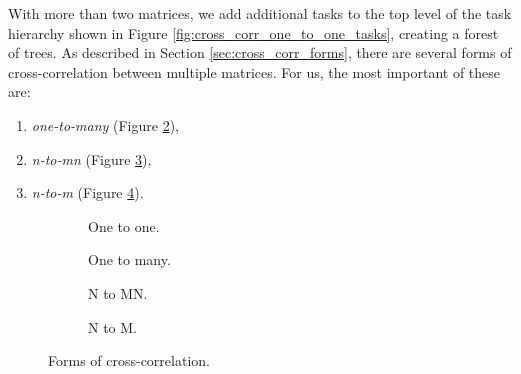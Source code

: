 With more than two matrices, we add additional tasks to the top level of the task hierarchy shown in Figure \ref{fig:cross_corr_one_to_one_tasks}, creating a forest of trees. As described in Section \ref{sec:cross_corr_forms}, there are several forms of cross-correlation between multiple matrices. For us, the most important of these are:
\begin{enumerate}
	\item \textit{one-to-many} (Figure \ref{fig:implementation_one_to_many}),
	\item \textit{n-to-mn} (Figure \ref{fig:implementation_n_to_mn}),
	\item \textit{n-to-m} (Figure \ref{fig:implementation_n_to_m}).
\end{enumerate}

\begin{figure}
	\centering	
	\begin{subfigure}{0.4\textwidth}
		\centering
		\def\svgwidth{0.5\textwidth}
		
		\caption{One to one.}
		\label{fig:implementation_one_to_one}
	\end{subfigure}
	\hfill
	\begin{subfigure}{0.4\textwidth}
		\centering
		\def\svgwidth{0.5\textwidth}
		
		\caption{One to many.}
		\label{fig:implementation_one_to_many}
	\end{subfigure}
	\hfill
	\begin{subfigure}{0.4\textwidth}
		\centering
		\def\svgwidth{0.7\textwidth}
		
		\caption{N to MN.}
		\label{fig:implementation_n_to_mn}
	\end{subfigure}
	\hfill
	\begin{subfigure}{0.4\textwidth}
		\centering
		\def\svgwidth{0.7\textwidth}
		
		\caption{N to M.}
		\label{fig:implementation_n_to_m}
	\end{subfigure}
	
	\caption{Forms of cross-correlation.}
	\label{fig:implementation_forms}
\end{figure}

